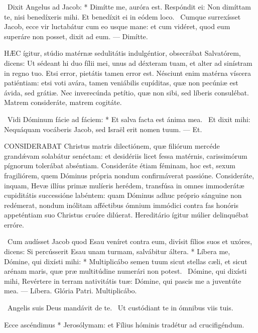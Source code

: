 \R\ Dixit Angelus ad Jacob: * Dimítte me, auróra est. Respóndit ei: Non dimíttam te, nisi benedíxeris mihi. Et benedíxit ei in eódem loco. \V\ Cumque surrexísset Jacob, ecce vir luctabátur cum eo usque mane: et cum vidéret, quod eum superáre non posset, dixit ad eum. --- Dimítte.


\lettrine[lines=2]{H}{ÆC} ígitur, stúdio matérnæ sedulitátis indulgéntior, obsecrábat Salvatórem, dicens: Ut sédeant hi duo fílii mei, unus ad déxteram tuam, et alter ad sinístram in regno tuo. Etsi error, pietátis tamen error est. Nésciunt enim matérna víscera patiéntiam: etsi voti avára, tamen veniábilis cupíditas, quæ non pecúniæ est ávida, sed grátiæ. Nec inverecúnda petítio, quæ non sibi, sed líberis consulébat. Matrem consideráte, matrem cogitáte.

\R\ Vidi Dóminum fácie ad fáciem: * Et salva facta est ánima mea. \V\ Et dixit mihi: Nequáquam vocáberis Jacob, sed Israël erit nomen tuum. --- Et.


\lettrine[lines=2]{C}{ONSIDERABAT} Christus matris dilectiónem, quæ filiórum mercéde grandǽvam solabátur senéctam: et desidériis licet fessa matérnis, carissimórum pígnorum tolerábat abséntiam. Consideráte étiam féminam, hoc est, sexum fragiliórem, quem Dóminus própria nondum confirmáverat passióne. Consideráte, inquam, Hevæ illíus primæ mulíeris herédem, transfúsa in omnes immoderátæ cupiditátis successióne labéntem: quam Dóminus adhuc próprio sánguine non redémerat, nondum inólitam afféctibus ómnium immódici contra fas honóris appeténtiam suo Christus cruóre dilúerat. Hereditário ígitur múlier delinquébat erróre.

\R\ Cum audísset Jacob quod Esau veníret contra eum, divísit fílios suos et uxóres, dicens: Si percússerit Esau unam turmam, salvábitur áltera. * Líbera me, Dómine, qui dixísti mihi: * Multiplicábo semen tuum sicut stellas cæli, et sicut arénam maris, quæ præ multitúdine numerári non potest. \V\ Dómine, qui dixísti mihi, Revértere in terram nativitátis tuæ: Dómine, qui pascis me a juventúte mea. --- Líbera. Glória Patri. Multiplicábo.

\V\ Angelis suis Deus mandávit de te. \R\ Ut custódiant te in ómnibus viis tuis.

 Ecce ascéndimus * Jerosólymam: et Fílius hóminis tradétur ad crucifigéndum.


